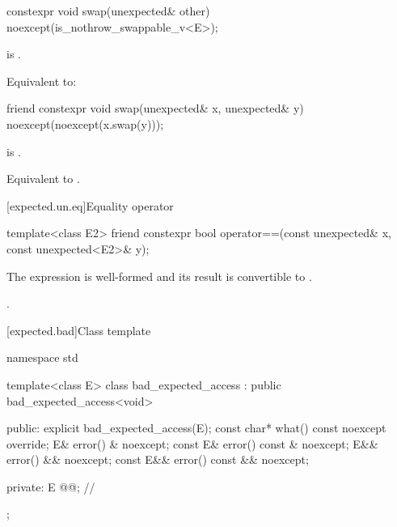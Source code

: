 %
\begin{itemdecl}
constexpr void swap(unexpected& other) noexcept(is_nothrow_swappable_v<E>);
\end{itemdecl}

\begin{itemdescr}
\pnum
\mandates
{} is .

\pnum
\effects
Equivalent to:
\end{itemdescr}

\begin{itemdecl}
friend constexpr void swap(unexpected& x, unexpected& y) noexcept(noexcept(x.swap(y)));
\end{itemdecl}

\begin{itemdescr}
\pnum
\constraints
{} is .

\pnum
\effects
Equivalent to .
\end{itemdescr}

[expected.un.eq]{Equality operator}

%
\begin{itemdecl}
template<class E2>
  friend constexpr bool operator==(const unexpected& x, const unexpected<E2>& y);
\end{itemdecl}

\begin{itemdescr}
\pnum
\mandates
The expression  is well-formed and
its result is convertible to .

\pnum
\returns
{}.
\end{itemdescr}

[expected.bad]{Class template }

%
\begin{codeblock}
namespace std {
  template<class E>
  class bad_expected_access : public bad_expected_access<void> {
  public:
    explicit bad_expected_access(E);
    const char* what() const noexcept override;
    E& error() & noexcept;
    const E& error() const & noexcept;
    E&& error() && noexcept;
    const E&& error() const && noexcept;

  private:
    E @@;             // \expos
  };
}
\end{codeblock}


